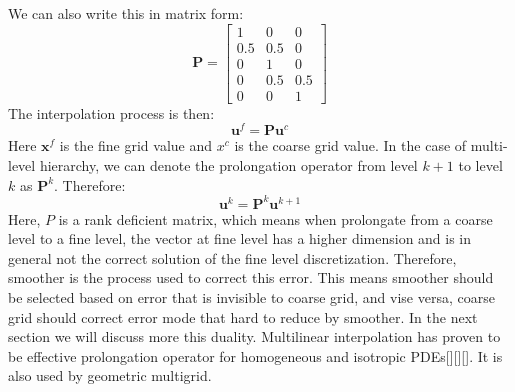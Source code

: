 We can also write this in matrix form:
$$
\mathbf{P} = \begin{bmatrix}
1 & 0 & 0 \\
0.5 & 0.5 & 0 \\ 
0 & 1 & 0 \\
0 & 0.5 & 0.5 \\
0 & 0 & 1
\end{bmatrix}
$$
The interpolation process is then:
\begin{equation}
\mathbf{u}^f = \mathbf{P} \mathbf{u}^c
\end{equation}
Here $\mathbf{x}^f$ is the fine grid value and $x^c$ is the coarse grid value. In the case of multi-level hierarchy, we can denote the prolongation operator from level $k+1$ to level $k$ as $\mathbf{P}^k$. Therefore:
\begin{equation}
\mathbf{u}^k = \mathbf{P}^k \mathbf{u}^{k+1}
\end{equation}
Here, $P$ is a rank deficient matrix, which means when prolongate from a coarse level to a fine level, the vector at fine level has a higher dimension and is in general not the correct solution of the fine level discretization. Therefore, smoother is the process used to correct this error. This means smoother should be selected based on error that is invisible to coarse grid, and vise versa, coarse grid should correct error mode that hard to reduce by smoother. In the next section we will discuss more this duality.  Multilinear interpolation has proven to be effective prolongation operator for homogeneous and isotropic PDEs[\cite{mcadams2010parallel}][\cite{aanjaneya2017power}][\cite{zhu2010efficient}]. It is also used by geometric multigrid. 

